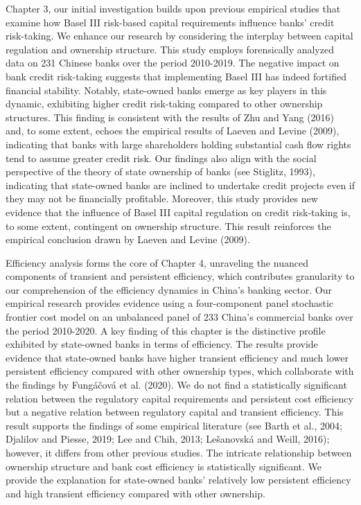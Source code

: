 \documentclass[
  12pt,
  a4paper,
]{scrreprt}
\begin{document}
Chapter 3, our initial investigation builds upon previous empirical
studies that examine how Basel III risk-based capital requirements
influence banks' credit risk-taking. We enhance our research by
considering the interplay between capital regulation and ownership
structure. This study employs forensically analyzed data on 231 Chinese
banks over the period 2010-2019. The negative impact on bank credit
risk-taking suggests that implementing Basel III has indeed fortified
financial stability. Notably, state-owned banks emerge as key players in
this dynamic, exhibiting higher credit risk-taking compared to other
ownership structures. This finding is consistent with the results of Zhu
and Yang (2016) and, to some extent, echoes the empirical results of
Laeven and Levine (2009), indicating that banks with large shareholders
holding substantial cash flow rights tend to assume greater credit risk.
Our findings also align with the social perspective of the theory of
state ownership of banks (see Stiglitz, 1993), indicating that
state-owned banks are inclined to undertake credit projects even if they
may not be financially profitable. Moreover, this study provides new
evidence that the influence of Basel III capital regulation on credit
risk-taking is, to some extent, contingent on ownership structure. This
result reinforces the empirical conclusion drawn by Laeven and Levine
(2009).

Efficiency analysis forms the core of Chapter 4, unraveling the nuanced
components of transient and persistent efficiency, which contributes
granularity to our comprehension of the efficiency dynamics in China's
banking sector. Our empirical research provides evidence using a
four-component panel stochastic frontier cost model on an unbalanced
panel of 233 China's commercial banks over the period 2010-2020. A key
finding of this chapter is the distinctive profile exhibited by
state-owned banks in terms of efficiency. The results provide evidence
that state-owned banks have higher transient efficiency and much lower
persistent efficiency compared with other ownership types, which
collaborate with the findings by Fungáčová et al. (2020). We do not find
a statistically significant relation between the regulatory capital
requirements and persistent cost efficiency but a negative relation
between regulatory capital and transient efficiency. This result
supports the findings of some empirical literature (see Barth et al.,
2004; Djalilov and Piesse, 2019; Lee and Chih, 2013; Lešanovská and
Weill, 2016); however, it differs from other previous studies. The
intricate relationship between ownership structure and bank cost
efficiency is statistically significant. We provide the explanation for
state-owned banks' relatively low persistent efficiency and high
transient efficiency compared with other ownership.
\end{document}
